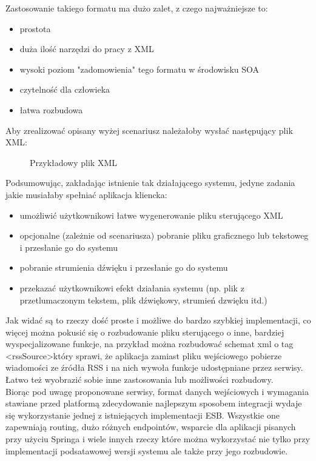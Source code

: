 Zastosowanie takiego formatu ma dużo zalet, z czego najważniejsze to:
\begin{itemize}
	\item prostota
	\item duża ilość narzędzi do pracy z XML
	\item wysoki poziom "zadomowienia" tego formatu w środowisku SOA
	\item czytelność dla człowieka
	\item łatwa rozbudowa
\end{itemize}
Aby zrealizować opisany wyżej scenariusz należałoby wysłać następujący plik XML:

\setlength\fboxsep{20pt}
\setlength\fboxrule{1pt}
\begin{figure}[!h]
	\centering
	\caption{Przykładowy plik XML}
\end{figure}

Podsumowując, zakładając istnienie tak działającego systemu, jedyne zadania jakie musiałaby spełniać aplikacja kliencka:
\begin{itemize}
	\item umożliwić użytkownikowi łatwe wygenerowanie pliku sterującego XML
	\item opcjonalne (zależnie od scenariusza) pobranie pliku graficznego lub tekstoweg i przesłanie go do systemu
	\item pobranie strumienia dźwięku i przesłanie go do systemu
	\item przekazać użytkownikowi efekt działania systemu (np. plik z przetlumaczonym tekstem, plik dźwiękowy, strumień dzwięku itd.)
\end{itemize}
Jak widać są to rzeczy dość proste i możliwe do bardzo szybkiej implementacji, co więcej można pokusić się o rozbudowanie pliku sterującego o inne, bardziej wyspecjalizowane funkcje, na przykład można rozbudować schemat xml o tag \textless rssSource\textgreater który sprawi, że aplikacja zamiast pliku wejściowego pobierze wiadomości ze źródła RSS i na nich wywoła funkcje udostępniane przez serwisy. Łatwo też wyobrazić sobie inne zastosowania lub możliwości rozbudowy. \\
Biorąc pod uwagę proponowane serwisy, format danych wejściowych i wymagania stawiane przed platformą zdecydowanie najlepszym sposobem integracji wydaje się wykorzystanie jednej z istniejących implementacji ESB. Wszystkie one zapewniają routing, dużo różnych endpointów, wsparcie dla aplikacji pisanych przy użyciu Springa i wiele innych rzeczy które można wykorzystać nie tylko przy implementacji podsatawowej wersji systemu ale także przy jego rozbudowie. 

